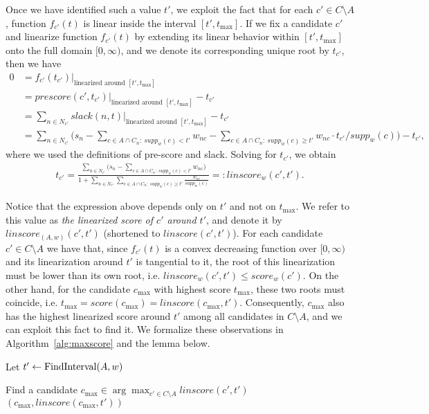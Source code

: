 Once we have identified such a value $t'$, we exploit the fact that for each $c'\in C\setminus A$, function $f_{c'}(t)$ is linear inside the interval $[t',t_{\max}]$. If we fix a candidate $c'$ and linearize function $f_{c'}(t)$ by extending its linear behavior within $[t', t_{\max}]$ onto the full domain $[0,\infty)$, and we denote its corresponding unique root by $t_{c'}$, then we have 
%
\begin{align*}
    0&= f_{c'}(t_{c'})|_{\text{linearized around } [t', t_{\max}]}\\
    &=prescore(c', t_{c'})|_{\text{linearized around } [t', t_{\max}]} - t_{c'}\\
    &=\sum_{n\in N_{c'}} slack(n,t)|_{\text{linearized around } [t', t_{\max}]} - t_{c'}\\
    &=\sum_{n\in N_{c'}} \Big( s_n - \sum_{c\in A\cap C_n: \ supp_{w}(c)< t'}w_{nc} - \sum_{c\in A\cap C_n: \ supp_w(c)\geq t'} w_{nc}\cdot t_{c'}/supp_w(c) \Big) - t_{c'},
\end{align*}
%
where we used the definitions of pre-score and slack. Solving for $t_{c'}$, we obtain
%
\begin{align*}
    t_{c'}=\frac{\sum_{n\in N_{c'}} \Big( s_n - \sum_{c\in A\cap C_n: \ supp_w(c)< t'} w_{nc} \Big)}%
    {1+\sum_{n\in N_{c'}} \sum_{c\in A\cap C_n: \ supp_w(c)\geq t'} \frac{w_{nc}}{supp_w(c)}}=:linscore_w(c',t').
\end{align*}

Notice that the expression above depends only on $t'$ and not on $t_{\max}$. We refer to this value as \emph{the linearized score of $c'$ around $t'$}, and denote it by $linscore_{(A,w)}(c',t')$ (shortened to $linscore(c',t')$). 
For each candidate $c'\in C\setminus A$ we have that, since $f_{c'}(t)$ is a convex decreasing function over $[0,\infty)$ and its linearization around $t'$ is tangential to it, the root of this linearization must be lower than its own root, i.e. $linscore_w(c',t')\leq score_w(c')$. 
On the other hand, for the candidate $c_{\max}$ with highest score $t_{\max}$, these two roots must coincide, i.e. $t_{\max}=score(c_{\max})=linscore(c_{\max}, t')$. Consequently, $c_{\max}$ also has the highest linearized score around $t'$ among all candidates in $C\setminus A$, and we can exploit this fact to find it. We formalize these observations in Algorithm~\ref{alg:maxscore} and the lemma below.

\begin{algorithm}[htb]\label{alg:maxscore}
\SetAlgoLined
{}
Let $t'\leftarrow \operatorname{FindInterval}(A,w)$\;

Find a candidate $c_{\max}\in\arg\max_{c'\in C\setminus A} linscore(c',t')$\;
\Return $(c_{\max}, linscore(c_{\max},t'))$\;
 \caption{$\maxscore(A,w)$}
\end{algorithm}

